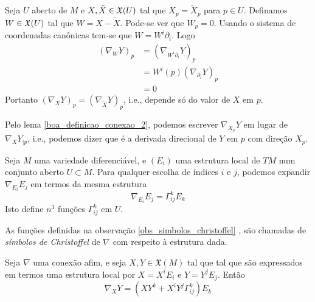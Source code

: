 \begin{demonstracao}
	Seja $U$ aberto de $M$ e $X, \tilde{X} \in \mathfrak{X}(U)$ tal que $X_p = \tilde{X}_p$ para $p \in U$. Definamos $W \in \mathfrak{X}(U)$ tal que $W = X - \tilde{X}$. Pode-se ver que $W_p = 0$. Usando o sistema de coordenadas canônicas tem-se que $W = W^i \partial_i$. Logo
	\begin{align*}
		(\nabla_W Y)_p &= (\nabla_{W^i \partial_i} Y)_p\\
		&=   W^i(p) (\nabla_{\partial_i} Y)_p\\
		&= 0
	\end{align*}
	Portanto $(\nabla_X Y)_p = (\nabla_{\tilde{X}} Y)_p$, i.e., depende só do valor de $X$ em $p$.
\end{demonstracao}

\begin{observacao}
	Pelo lema \ref{boa_definicao_conexao_2}, podemos escrever $\nabla_{X_p} Y$ em lugar de $\nabla_X Y_{|p}$, i.e., podemos dizer que é a derivada direcional de $Y$ em $p$ com direção $X_p$.
\end{observacao}

\begin{observacao}\label{obs_simbolos_christoffel}
	Seja $M$ uma variedade diferenciável, e $(E_i)$ uma estrutura local de $TM$ num conjunto aberto $U \subset M$. Para qualquer escolha de índices $i$ e $j$, podemos expandir $\nabla_{E_i} E_j$ em termos da mesma estrutura
	\begin{equation*}
		\nabla_{E_i} E_j = \Gamma^k_{ij} E_k
	\end{equation*}
	Isto define $n^3$ funções $\Gamma^k_{ij}$ em $U$.
\end{observacao}

\begin{definicao} 
	As funções definidas na observação \ref{obs_simbolos_christoffel} , são chamadas de \emph{símbolos de Christoffel} de $\nabla$ com respeito à estrutura dada.
\end{definicao}

\begin{lema}\label{conexiones lineales en función de símbolos de Chritoffel}
	Seja $\nabla$ uma conexão afim, e seja $X,Y \in \mathfrak{X}(M)$ tal que tal que são expressados em termos uma estrutura local por $X = X^i E_i$ e $Y = Y^j E_j$. Então
	\begin{equation*}
		\nabla_X Y = \left( X Y^k + X^i Y^j \Gamma^k_{ij} \right) E_k
	\end{equation*}
\end{lema}

